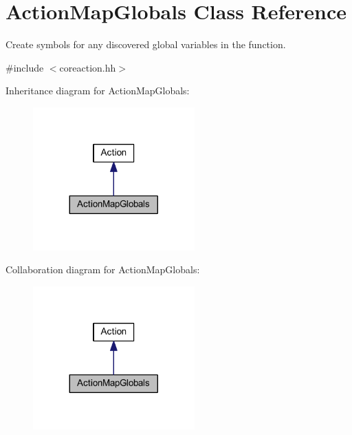 \hypertarget{class_action_map_globals}{}\section{Action\+Map\+Globals Class Reference}
\label{class_action_map_globals}


Create symbols for any discovered global variables in the function.  




{\ttfamily \#include $<$coreaction.\+hh$>$}



Inheritance diagram for Action\+Map\+Globals\+:
\nopagebreak
\begin{figure}[H]
\begin{center}
\leavevmode
\includegraphics[width=176pt]{class_action_map_globals__inherit__graph}
\end{center}
\end{figure}


Collaboration diagram for Action\+Map\+Globals\+:
\nopagebreak
\begin{figure}[H]
\begin{center}
\leavevmode
\includegraphics[width=176pt]{class_action_map_globals__coll__graph}
\end{center}
\end{figure}
